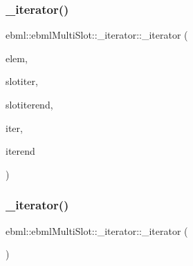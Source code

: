 \subsubsection{\texorpdfstring{\+\_\+iterator()}{\_iterator()}\hspace{0.1cm}{\footnotesize\ttfamily [2/3]}}
{\footnotesize\ttfamily ebml\+::ebml\+Multi\+Slot\+::\+\_\+iterator\+::\+\_\+iterator (\begin{DoxyParamCaption}\item[{\mbox{\hyperlink{namespaceebml_adad533b7705a16bb360fe56380c5e7be}{ebml\+Element\+\_\+sp}} \&\&}]{elem,  }\item[{std\+::vector$<$ \+\_\+slot\+\_\+t $>$\+::\mbox{\hyperlink{classebml_1_1ebmlMasterElement_1_1iterator}{iterator}} \&\&}]{slotiter,  }\item[{std\+::vector$<$ \+\_\+slot\+\_\+t $>$\+::\mbox{\hyperlink{classebml_1_1ebmlMasterElement_1_1iterator}{iterator}} \&\&}]{slotiterend,  }\item[{\mbox{\hyperlink{classebml_1_1slot__t_1_1iterator}{slot\+\_\+t\+::iterator}} \&\&}]{iter,  }\item[{\mbox{\hyperlink{classebml_1_1slot__t_1_1iterator}{slot\+\_\+t\+::iterator}} \&\&}]{iterend }\end{DoxyParamCaption})\hspace{0.3cm}{\ttfamily [protected]}}

\mbox{\label{classebml_1_1ebmlMultiSlot_1_1__iterator_a9a5bb54966d95ad5ea80373761494523}} 
\subsubsection{\texorpdfstring{\+\_\+iterator()}{\_iterator()}\hspace{0.1cm}{\footnotesize\ttfamily [3/3]}}
{\footnotesize\ttfamily ebml\+::ebml\+Multi\+Slot\+::\+\_\+iterator\+::\+\_\+iterator (\begin{DoxyParamCaption}{ }\end{DoxyParamCaption})}

\mbox{\label{classebml_1_1ebmlMultiSlot_1_1__iterator_a1d4b6ffee0d593ee22ac312d61d99d16}} 
